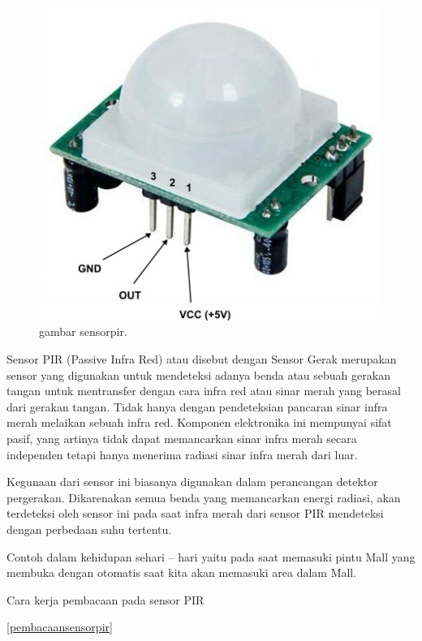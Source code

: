 \documentclass{article}
\begin{document}
\begin{figure}[ht]
\centerline{\includegraphics[width=1\textwidth]{figures/sensorpir.JPG}}
\caption{gambar sensorpir.}
\label{sensorpir.JPG}
\end{figure}

Sensor PIR (Passive Infra Red) atau disebut dengan Sensor Gerak merupakan sensor yang digunakan untuk mendeteksi adanya benda atau sebuah gerakan tangan untuk mentransfer dengan cara infra red atau sinar merah yang berasal dari gerakan tangan. Tidak hanya dengan pendeteksian pancaran sinar infra merah melaikan sebuah infra red.
Komponen elektronika ini mempunyai sifat pasif, yang artinya tidak dapat memancarkan sinar infra merah secara independen tetapi hanya menerima radiasi sinar infra merah dari luar.

Kegunaan dari sensor ini biasanya digunakan dalam perancangan detektor pergerakan. Dikarenakan semua benda yang memancarkan energi radiasi, akan terdeteksi oleh sensor ini pada saat infra merah dari sensor PIR mendeteksi dengan perbedaan suhu tertentu.

Contoh dalam kehidupan sehari – hari yaitu pada saat memasuki pintu Mall yang membuka dengan otomatis saat kita akan memasuki area dalam Mall.

Cara kerja pembacaan pada sensor PIR

\ref{pembacaansensorpir}
\end{document}
